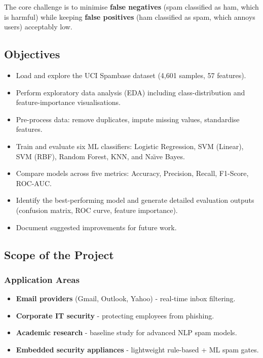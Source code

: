 \documentclass[12pt, a4paper]{article}
\begin{document}
The core challenge is to minimise \textbf{false negatives} (spam classified as ham, which is harmful) while keeping \textbf{false positives} (ham classified as spam, which annoys users) acceptably low.

\subsection{Objectives}
\begin{itemize}
    \item Load and explore the UCI Spambase dataset (4,601 samples, 57 features).
    \item Perform exploratory data analysis (EDA) including class-distribution and feature-importance visualisations.
    \item Pre-process data: remove duplicates, impute missing values, standardise features.
    \item Train and evaluate six ML classifiers: Logistic Regression, SVM (Linear), SVM (RBF), Random Forest, KNN, and Na\"{\i}ve Bayes.
    \item Compare models across five metrics: Accuracy, Precision, Recall, F1-Score, ROC-AUC.
    \item Identify the best-performing model and generate detailed evaluation outputs (confusion matrix, ROC curve, feature importance).
    \item Document suggested improvements for future work.
\end{itemize}

\subsection{Scope of the Project}

\subsubsection*{Application Areas}
\begin{itemize}
    \item \textbf{Email providers} (Gmail, Outlook, Yahoo) - real-time inbox filtering.
    \item \textbf{Corporate IT security} - protecting employees from phishing.
    \item \textbf{Academic research} - baseline study for advanced NLP spam models.
    \item \textbf{Embedded security appliances} - lightweight rule-based + ML spam gates.
\end{itemize}
\end{document}
